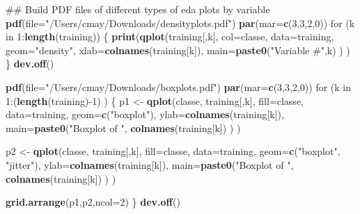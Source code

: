 \documentclass[]{article}
\newenvironment{Shaded}{\begin{snugshade}}{\end{snugshade}}
\newcommand{\KeywordTok}[1]{\textcolor[rgb]{0.13,0.29,0.53}{\textbf{{#1}}}}
\newcommand{\DataTypeTok}[1]{\textcolor[rgb]{0.13,0.29,0.53}{{#1}}}
\newcommand{\DecValTok}[1]{\textcolor[rgb]{0.00,0.00,0.81}{{#1}}}
\newcommand{\StringTok}[1]{\textcolor[rgb]{0.31,0.60,0.02}{{#1}}}
\newcommand{\NormalTok}[1]{{#1}}
\begin{document}
\begin{Shaded}
\begin{Highlighting}[]
  \NormalTok{## Build PDF files of different types of eda plots by variable}
  \KeywordTok{pdf}\NormalTok{(}\DataTypeTok{file=}\StringTok{"/Users/cmay/Downloads/densityplots.pdf"}\NormalTok{)}
  \KeywordTok{par}\NormalTok{(}\DataTypeTok{mar=}\KeywordTok{c}\NormalTok{(}\DecValTok{3}\NormalTok{,}\DecValTok{3}\NormalTok{,}\DecValTok{2}\NormalTok{,}\DecValTok{0}\NormalTok{))}
  \NormalTok{for (k in }\DecValTok{1}\NormalTok{:}\KeywordTok{length}\NormalTok{(training)) \{}
    \KeywordTok{print}\NormalTok{(}\KeywordTok{qplot}\NormalTok{(training[,k], }\DataTypeTok{col=}\NormalTok{classe, }\DataTypeTok{data=}\NormalTok{training, }\DataTypeTok{geom=}\StringTok{"density"}\NormalTok{, }\DataTypeTok{xlab=}\KeywordTok{colnames}\NormalTok{(training[k]), }
                \DataTypeTok{main=}\KeywordTok{paste0}\NormalTok{(}\StringTok{"Variable #"}\NormalTok{,k) ) )}
  \NormalTok{\}}
  \KeywordTok{dev.off}\NormalTok{()}
  
  \KeywordTok{pdf}\NormalTok{(}\DataTypeTok{file=}\StringTok{"/Users/cmay/Downloads/boxplots.pdf"}\NormalTok{)}
  \KeywordTok{par}\NormalTok{(}\DataTypeTok{mar=}\KeywordTok{c}\NormalTok{(}\DecValTok{3}\NormalTok{,}\DecValTok{3}\NormalTok{,}\DecValTok{2}\NormalTok{,}\DecValTok{0}\NormalTok{))}
  \NormalTok{for (k in }\DecValTok{1}\NormalTok{:(}\KeywordTok{length}\NormalTok{(training)-}\DecValTok{1}\NormalTok{) ) \{}
    \NormalTok{p1 <-}\StringTok{ }\KeywordTok{qplot}\NormalTok{(classe, training[,k], }\DataTypeTok{fill=}\NormalTok{classe, }\DataTypeTok{data=}\NormalTok{training, }\DataTypeTok{geom=}\KeywordTok{c}\NormalTok{(}\StringTok{"boxplot"}\NormalTok{), }\DataTypeTok{ylab=}\KeywordTok{colnames}\NormalTok{(training[k]),}
                \DataTypeTok{main=}\KeywordTok{paste0}\NormalTok{(}\StringTok{"Boxplot of "}\NormalTok{, }\KeywordTok{colnames}\NormalTok{(training[k]) ) )}
    
    \NormalTok{p2 <-}\StringTok{ }\KeywordTok{qplot}\NormalTok{(classe, training[,k], }\DataTypeTok{fill=}\NormalTok{classe, }\DataTypeTok{data=}\NormalTok{training, }\DataTypeTok{geom=}\KeywordTok{c}\NormalTok{(}\StringTok{"boxplot"}\NormalTok{, }\StringTok{"jitter"}\NormalTok{), }\DataTypeTok{ylab=}\KeywordTok{colnames}\NormalTok{(training[k]),}
                \DataTypeTok{main=}\KeywordTok{paste0}\NormalTok{(}\StringTok{"Boxplot of "}\NormalTok{, }\KeywordTok{colnames}\NormalTok{(training[k]) ) )}
    
    \KeywordTok{grid.arrange}\NormalTok{(p1,p2,}\DataTypeTok{ncol=}\DecValTok{2}\NormalTok{)  }
  \NormalTok{\}}
  \KeywordTok{dev.off}\NormalTok{()}
  

\end{Highlighting}
\end{Shaded}
\end{document}
